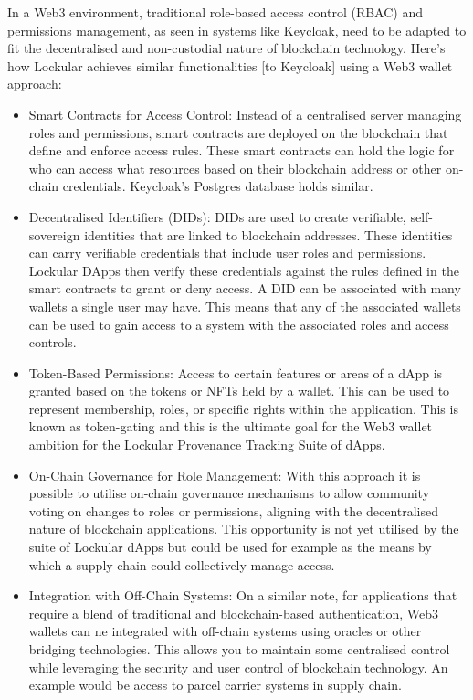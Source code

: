 \documentclass{tufte-handout}
\begin{document}
 In a Web3 environment, traditional role-based access control (RBAC) and permissions management, as seen in systems like Keycloak, need to be adapted
 to fit the decentralised and non-custodial nature of blockchain technology. Here's how Lockular achieves similar functionalities [to Keycloak] using
 a Web3 wallet approach:
 \begin{itemize}
    \item Smart Contracts for Access Control: Instead of a centralised server managing roles and permissions, smart contracts are deployed on the
    blockchain that define and enforce access rules. These smart contracts can hold the logic for who can access what resources based on their
    blockchain address or other on-chain credentials. Keycloak's Postgres database holds similar.
    \item Decentralised Identifiers (DIDs): DIDs are used to create verifiable, self-sovereign identities that are linked to blockchain addresses.
    These identities can carry verifiable credentials that include user roles and permissions. Lockular DApps then verify these credentials
    against the rules defined in the smart contracts to grant or deny access. A DID can be associated with many wallets a single user may have. This means
    that any of the associated wallets can be used to gain access to a system with the associated roles and access controls.
    \item Token-Based Permissions: Access to certain features or areas of a dApp is granted based on the tokens or NFTs held by a wallet.
    This can be used to represent membership, roles, or specific rights within the application. This is known as token-gating and this is the ultimate goal
    for the Web3 wallet ambition for the Lockular Provenance Tracking Suite of dApps.
    \item On-Chain Governance for Role Management: With this approach it is possible to utilise on-chain governance mechanisms to allow community
    voting on changes to roles or permissions, aligning with the decentralised nature of blockchain applications. This opportunity is not yet
    utilised by the suite of Lockular dApps but could be used for example as the means by which a supply chain could collectively manage access.
    \item Integration with Off-Chain Systems: On a similar note, for applications that require a blend of traditional and blockchain-based
    authentication, Web3 wallets can ne integrated with off-chain systems using oracles or other bridging technologies. This allows you to
    maintain some centralised control while leveraging the security and user control of blockchain technology. An example would be access to
    parcel carrier systems in supply chain.
\end{itemize}
\end{document}
